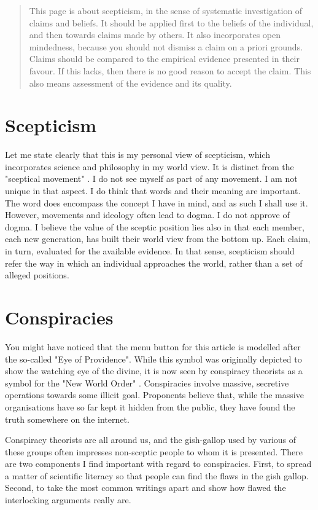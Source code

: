 \begin{abstract}
This page is about scepticism, in the sense of systematic investigation of claims and beliefs. It should be applied first to the beliefs
of the individual, and then towards claims made by others. It also incorporates open mindedness, because you should not dismiss a claim
on a priori grounds. Claims should be compared to the empirical evidence presented in their favour. If this lacks, then there is no good
reason to accept the claim. This also means assessment of the evidence and its quality.
\end{abstract}
\begin{multicols}{2}
\section{Scepticism}




Let me state clearly that this is my personal view of scepticism, which incorporates science and philosophy in my world view. It is distinct
from the "sceptical movement" \cite{wikism}. I do not see myself as 
part of any movement. I am not unique in that aspect. I do think that words and their meaning are important. The word does encompass the
concept I have in mind, and as such I shall use it. However, movements and ideology often lead to dogma. I do not approve of dogma. I believe
the value of the sceptic position lies also in that each member, each new generation, has built their world view from the bottom up. Each claim,
in turn, evaluated for the available evidence. In that sense, scepticism should refer the way in which an individual approaches the world, rather
than a set of alleged positions.

\section{Conspiracies}

You might have noticed that the menu button for this article is modelled after the so-called "Eye of Providence". While this symbol was originally
depicted to show the watching eye of the divine, it is now seen by conspiracy theorists as a symbol for the "New World Order" \cite{wikinwo}.
Conspiracies involve massive, secretive operations towards some illicit goal. Proponents believe that, while the massive
organisations have so far kept it hidden from the public, they have found the truth somewhere on the internet.


Conspiracy theorists are all around us, and the gish-gallop used by various of these groups often impresses non-sceptic people to whom it is presented.
There are two components I find important with regard to conspiracies. First, to spread a matter of scientific literacy so that people can find the
flaws in the gish gallop. Second, to take the most common writings apart and show how flawed the interlocking arguments really are.



\end{multicols}
